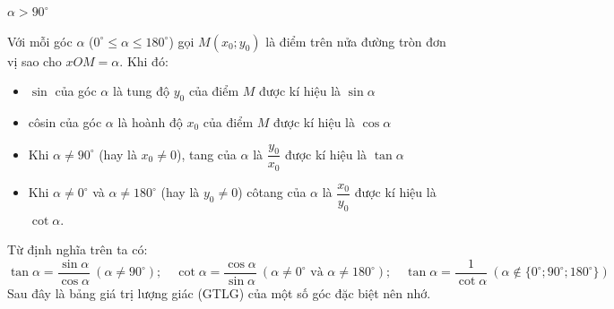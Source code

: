 \documentclass[12pt,a4paper]{extarticle}
\begin{document}
\begin{center}
\begin{minipage}{0.48\textwidth}
        
        \vspace{0.3cm}
        $\alpha > 90^\circ$
    \end{minipage}
\end{center}
\vspace{0.5cm}
Với mỗi góc $\alpha$ ($0^\circ \le \alpha \le 180^\circ$) gọi $M(x_0; y_0)$ là điểm trên nửa đường tròn đơn vị sao cho $xOM = \alpha$. Khi đó:
\begin{itemize}
    \item $\sin$ của góc $\alpha$ là tung độ $y_0$ của điểm $M$ được kí hiệu là $\sin \alpha$
    \item côsin của góc $\alpha$ là hoành độ $x_0$ của điểm $M$ được kí hiệu là $\cos \alpha$
    \item Khi $\alpha \ne 90^\circ$ (hay là $x_0 \ne 0$), tang của $\alpha$ là $\dfrac{y_0}{x_0}$ được kí hiệu là $\tan \alpha$
    \item Khi $\alpha \ne 0^\circ$ và $\alpha \ne 180^\circ$ (hay là $y_0 \ne 0$) côtang của $\alpha$ là $\dfrac{x_0}{y_0}$ được kí hiệu là $\cot \alpha$.
\end{itemize}
Từ định nghĩa trên ta có:
\[
\tan\alpha = \frac{\sin\alpha}{\cos\alpha} \ (\alpha \ne 90^\circ); \quad \cot\alpha = \frac{\cos\alpha}{\sin\alpha} \ (\alpha \ne 0^\circ \text{ và } \alpha \ne 180^\circ); \quad \tan\alpha = \frac{1}{\cot\alpha} \ (\alpha \notin \{0^\circ; 90^\circ; 180^\circ\})
\]
Sau đây là bảng giá trị lượng giác (GTLG) của một số góc đặc biệt nên nhớ.
\end{document}
